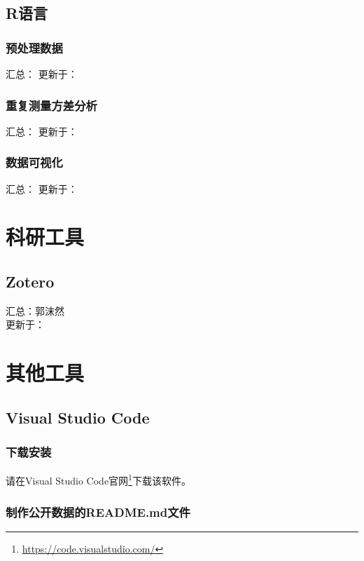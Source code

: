 \documentclass[]{ctexbook}
\renewcommand{\href}[2]{#2\footnote{\url{#1}}}
\theoremstyle{definition}
\theoremstyle{definition}
\theoremstyle{definition}
\theoremstyle{definition}
\theoremstyle{remark}
\begin{document}
\chapter{R语言}\label{r}

\section{预处理数据}\label{r-prepro}

汇总：
更新于：

\section{重复测量方差分析}\label{r-rm-anova}

汇总：
更新于：

\section{数据可视化}\label{r-plot}

汇总：
更新于：

\part{科研工具}\label{part-ux79d1ux7814ux5de5ux5177}

\chapter{Zotero}\label{zotero}

汇总：郭沫然\\
更新于：

\part{其他工具}\label{part-ux5176ux4ed6ux5de5ux5177}

\chapter{Visual Studio Code}\label{vscode}

\section{下载安装}\label{ux4e0bux8f7dux5b89ux88c5}

请在\href{https://code.visualstudio.com/}{Visual Studio Code官网}下载该软件。

\section{制作公开数据的README.md文件}\label{mkreadme}
\end{document}

